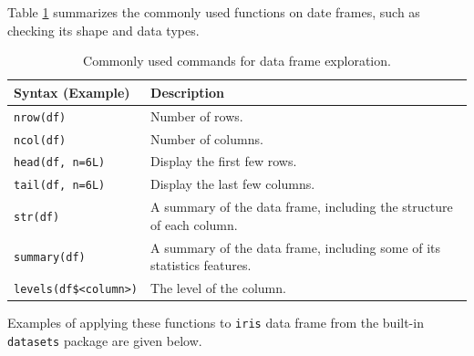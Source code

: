 Table \ref{ch:r1:tab:dataframeexplore} summarizes the commonly used functions on date frames, such as checking its shape and data types.
\begin{table}
  \centering \caption{Commonly used commands for data frame exploration.}\label{ch:r1:tab:dataframeexplore}
  \begin{tabularx}{\textwidth}{lX}
    \hline
    Syntax (Example) & Description \\ \hline
    \verb|nrow(df)| & Number of rows. \\
    \verb|ncol(df)| & Number of columns. \\
    \verb|head(df, n=6L)| & Display the first few rows. \\
    \verb|tail(df, n=6L)| & Display the last few columns. \\
    \verb|str(df)| & A summary of the data frame, including the structure of each column. \\
    \verb|summary(df)| & A summary of the data frame, including some of its statistics features. \\
    \verb|levels(df$<column>)| & The level of the column. \\
    \hline
  \end{tabularx}
\end{table}
Examples of applying these functions to \verb|iris| data frame from the built-in \verb|datasets| package are given below.
